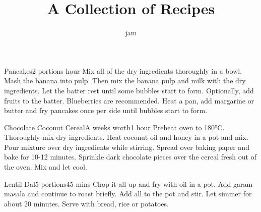 \documentclass[]{article}
\title{A Collection of Recipes}
\author{jam}
\begin{document}
\renewcommand*{\recipetitlefont}{\large\bfseries\sffamily}
\renewcommand*{\recipenumberfont}{\large\bfseries\sffamily}
\renewcommand*{\recipequantityfont}{\sffamily\bfseries}
\renewcommand*{\recipeunitfont}{\sffamily}
\renewcommand*{\recipeingredientfont}{\sffamily}
\renewcommand*{\recipefreeformfont}{\itshape}
\maketitle

\tableofcontents
\begin{center}
\begin{recipe}{Pancakes}{2 portions}{ hour}
	Mix all of the dry ingredients thoroughly in a bowl.
	Mash the banana into pulp.
	Then mix the banana pulp and milk with the dry ingredients.
	Let the batter rest until some bubbles start to form.
	Optionally, add fruits to the batter.
	Blueberries are recommended.
	\freeform Heat a pan, add margarine or butter and fry pancakes once per side until bubbles start to form.
	\freeform\hrulefill
\end{recipe}

\begin{recipe}{Chocolate Coconut Cereal}{A weeks worth}{1 hour}
	Preheat oven to 180°C.
	Thoroughly mix dry ingredients.
	Heat coconut oil and honey in a pot and mix.
	Pour mixture over dry ingredients while stirring.
	\newstep
	Spread over baking paper and bake for 10-12 minutes.
	Sprinkle dark chocolate pieces over the cereal fresh out of the oven.
	Mix and let cool.
	\freeform\hrulefill
\end{recipe}

\begin{recipe}{Lentil Dal}{5 portions}{45 mins}
	Chop it all up and fry with oil in a pot.
	Add garam masala and continue to roast briefly.
	Add all to the pot and stir.
	Let simmer for about 20 minutes.
	\freeform Serve with bread, rice or potatoes.
	\freeform\hrulefill
\end{recipe}


\end{center}
\end{document}
